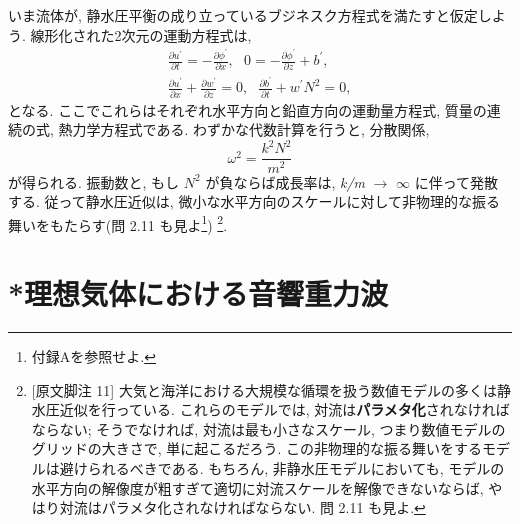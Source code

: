 \documentclass[a4j,12pt,openbib,oneside,dvipdfmx]{jsbook}
\def\theequation{\arabic{chapter}.\arabic{equation}}
\def\thepage{\arabic{page}}
\def\thefootnote{*\arabic{footnote}}
\begin{document}

\subsubsection{}

いま流体が, 静水圧平衡の成り立っているブジネスク方程式を満たすと仮定しよう. 線形化された2次元の運動方程式は, 
\begin{subequations}
\begin{gather}
\frac{\partial u^{\prime}}{\partial t}=-\frac{\partial {\phi}^{\prime}}{\partial x},\ \ \ 0=-\frac{\partial {\phi}^{\prime}}{\partial z}+b^{\prime}, \\ 
\frac{\partial u^{\prime}}{\partial x}+\frac{\partial w^{\prime}}{\partial z}=0,\ \ \ \frac{\partial b^{\prime}}{\partial t}+w^{\prime}N^2=0,
\end{gather}
\end{subequations}
となる. ここでこれらはそれぞれ水平方向と鉛直方向の運動量方程式, 質量の連続の式, 熱力学方程式である. わずかな代数計算を行うと, 分散関係,
\begin{equation}
{\omega}^2=\frac{k^2N^2}{m^2}
\end{equation}
が得られる. 振動数と, もし $N^2$ が負ならば成長率は, {\it k/m} $\to$ $\infty$ に伴って発散する. 従って静水圧近似は, 微小な水平方向のスケールに対して非物理的な振る舞いをもたらす(問 2.11 も見よ{\footnote{付録Aを参照せよ.}})
{\footnote{[原文脚注 11] 大気と海洋における大規模な循環を扱う数値モデルの多くは静水圧近似を行っている. これらのモデルでは, 対流は{\bf パラメタ化}されなければならない; そうでなければ, 対流は最も小さなスケール, つまり数値モデルのグリッドの大きさで, 単に起こるだろう. この非物理的な振る舞いをするモデルは避けられるべきである. もちろん, 非静水圧モデルにおいても, モデルの水平方向の解像度が粗すぎて適切に対流スケールを解像できないならば, やはり対流はパラメタ化されなければならない. 問 2.11 も見よ.}}.\\

\newpage
\def\theequation{\arabic{chapter}.\arabic{equation}}
\def\thefootnote{*\arabic{footnote}}
\renewcommand{\thepage}{\arabic{page}}
\setcounter{chapter}{2}    %
\setcounter{section}{10}    %
\setcounter{equation}{252}   %

\section{*理想気体における音響重力波}  
\end{document}
